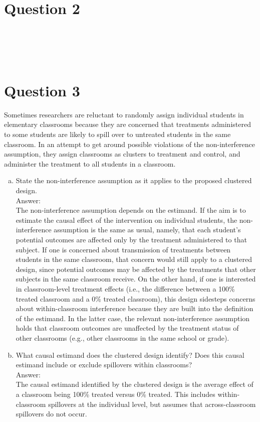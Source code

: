 \documentclass[11pt,notitlepage]{article}\usepackage[]{graphicx}\usepackage[]{color}
\makeatletter
\newenvironment{kframe}{%
 \def\at@end@of@kframe{}%
 \ifinner\ifhmode%
  \def\at@end@of@kframe{\end{minipage}}%
  \begin{minipage}{\columnwidth}%
 \fi\fi%
 \def\FrameCommand##1{\hskip\@totalleftmargin \hskip-\fboxsep
 \colorbox{shadecolor}{##1}\hskip-\fboxsep
     \hskip-\linewidth \hskip-\@totalleftmargin \hskip\columnwidth}%
 \MakeFramed {\advance\hsize-\width
   \@totalleftmargin\z@ \linewidth\hsize
   \@setminipage}}%
 {\par\unskip\endMakeFramed%
 \at@end@of@kframe}
\newenvironment{knitrout}{}{} %
\makeatother
\begin{document}
\section*{Question 2}
\begin{knitrout}
\color{fgcolor}\begin{kframe}
\begin{verbatim}





\end{verbatim}
\end{kframe}
\end{knitrout}

\section*{Question 3}
Sometimes researchers are reluctant to randomly assign individual students in elementary classrooms because they are concerned that treatments administered to some students are likely to spill over to untreated students in the same classroom. In an attempt to get around possible violations of the non-interference assumption, they assign classrooms as clusters to treatment and control, and administer the treatment to all students in a classroom.
\begin{enumerate}[a)]
\item State the non-interference assumption as it applies to the proposed clustered design. \\
Answer:\\
The non-interference assumption depends on the estimand. If the aim is to estimate the causal effect of the intervention on individual students, the non-interference assumption is the same as usual, namely, that each student's potential outcomes are affected only by the treatment administered to that subject. If one is concerned about transmission of treatments between students in the same classroom, that concern would still apply to a clustered design, since potential outcomes may be affected by the treatments that other subjects in the same classroom receive. On the other hand, if one is interested in classroom-level treatment effects (i.e., the difference between a 100\% treated classroom and a 0\% treated classroom), this design sidesteps concerns about within-classroom interference because they are built into the definition of the estimand. In the latter case, the relevant non-interference assumption holds that classroom outcomes are unaffected by the treatment status of other classrooms (e.g., other classrooms in the same school or grade).
\item What causal estimand does the clustered design identify? Does this causal estimand include or exclude spillovers within classrooms?\\
Answer:\\
The causal estimand identified by the clustered design is the average effect of a classroom being 100\% treated versus 0\% treated. This includes within-classroom spillovers at the individual level, but assumes that across-classroom spillovers do not occur.
\end{enumerate}
\end{document}
